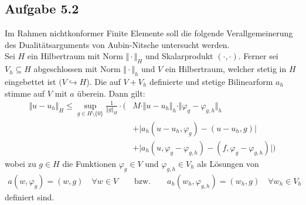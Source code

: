 \subsection{Aufgabe 5.2}
Im Rahmen nichtkonformer Finite Elemente soll die folgende Verallgemeinerung des Dualitätsarguments von Aubin-Nitsche untersucht werden.\\
Sei $H$ ein Hilbertraum mit Norm $\Vert\cdot\Vert_H$ und Skalarprodukt $(\cdot,\cdot)$. 
Ferner sei $V_h\subseteq H$ abgeschlossen mit Norm $\Vert\cdot\Vert_h$ und $V$ ein Hilbertraum, welcher stetig in $H$ eingebettet ist $(V\hookrightarrow H$). 
Die auf $V+V_h$ definierte und stetige Bilinearform $a_h$ stimme auf $V$ mit $a$ überein. 
Dann gilt:
\begin{align*}
	\Vert u-u_h\Vert_H\leq\sup\limits_{g\in H\setminus\lbrace0\rbrace}\frac{1}{\Vert g\Vert_H}\cdot\Big( &M\cdot\Vert u-u_h\Vert_h\cdot\Vert\varphi_g-\varphi_{g,h}\Vert_h\\
	&+\big|a_h(u-u_h,\varphi_g)-(u-u_h,g)\big|\\
	&+\big|a_h(u,\varphi_g-\varphi_{g,h})-(f,\varphi_g-\varphi_{g,h})\big|\Big)
\end{align*}
wobei zu $g\in H$ die Funktionen $\varphi_g\in V$ und $\varphi_{g,h}\in V_h$ als Lösungen von
\begin{align*}
	a(w,\varphi_g)=(w,g)\quad\forall w\in V\qquad\text{bzw.}\qquad a_h(w_h,\varphi_{g,h})=(w_h,g)\quad\forall w_h\in V_h
\end{align*}
definiert sind.


